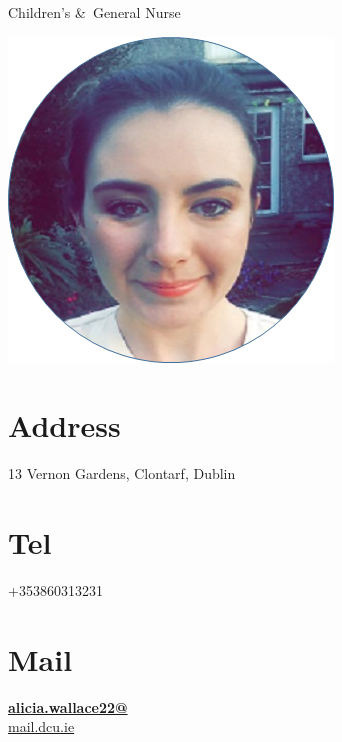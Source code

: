 \documentclass[]{friggeri-cv}
\begin{document}
      {Children's \&\ General Nurse}
      

\begin{aside}
  \includegraphics[scale=.4]{img/Alicia.png}
  \section{Address}
    13 Vernon Gardens,
    Clontarf,
    Dublin
    ~

  \section{Tel}
    +353860313231
    ~

  \section{Mail}
    \href{mailto:alicia.wallace22@mail.dcu.ie}{\textbf{alicia.wallace22@}\\mail.dcu.ie}
    ~

~
~
~
~
~
~
~
~
~
~
~
~
~
~
~
~



\end{aside}
\end{document}
